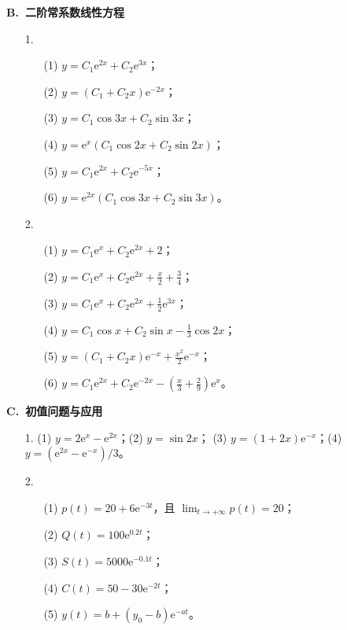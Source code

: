 \documentclass[fontset=fandol]{ctexart}
\newcommand{\ee}{\mathrm{e}}
\begin{document}
\textbf{B.\ 二阶常系数线性方程}

\begin{enumerate}
\item[1.]
\begin{enumerate}
\item[(1)] $y=C_1\ee^{2x}+C_2\ee^{3x}$；
\item[(2)] $y=(C_1+C_2x)\ee^{-2x}$；
\item[(3)] $y=C_1\cos3x+C_2\sin3x$；
\item[(4)] $y=\ee^x(C_1\cos2x+C_2\sin2x)$；
\item[(5)] $y=C_1\ee^{2x}+C_2\ee^{-5x}$；
\item[(6)] $y=\ee^{2x}(C_1\cos3x+C_2\sin3x)$。
\end{enumerate}
\item[2.]
\begin{enumerate}
\item[(1)] $y=C_1\ee^x+C_2\ee^{2x}+2$；
\item[(2)] $\displaystyle y=C_1\ee^x+C_2\ee^{2x}+\frac{x}{2}+\frac34$；
\item[(3)] $\displaystyle y=C_1\ee^x+C_2\ee^{2x}+\frac12\ee^{3x}$；
\item[(4)] $\displaystyle y=C_1\cos x+C_2\sin x-\frac13\cos2x$；
\item[(5)] $\displaystyle y=(C_1+C_2x)\ee^{-x}+\frac{x^2}{2}\ee^{-x}$；
\item[(6)] $\displaystyle y=C_1\ee^{2x}+C_2\ee^{-2x}-\left(\frac{x}{3}+\frac29\right)\ee^x$。
\end{enumerate}
\end{enumerate}

\textbf{C.\ 初值问题与应用}

\begin{enumerate}
\item[1.] (1) $\displaystyle y=2\ee^x-\ee^{2x}$；(2) $y=\sin2x$；
(3) $\displaystyle y=(1+2x)\ee^{-x}$；(4) $\displaystyle y=(\ee^{2x}-\ee^{-x})/3$。
\item[2.]
\begin{enumerate}
\item[(1)] $p(t)=20+6\ee^{-3t}$，且 $\displaystyle \lim_{t\to+\infty}p(t)=20$；
\item[(2)] $Q(t)=100\ee^{0.2t}$；
\item[(3)] $S(t)=5000\ee^{-0.1t}$；
\item[(4)] $C(t)=50-30\ee^{-2t}$；
\item[(5)] $\displaystyle y(t)=b+(y_0-b)\ee^{-at}$。
\end{enumerate}
\end{enumerate}
\end{document}
